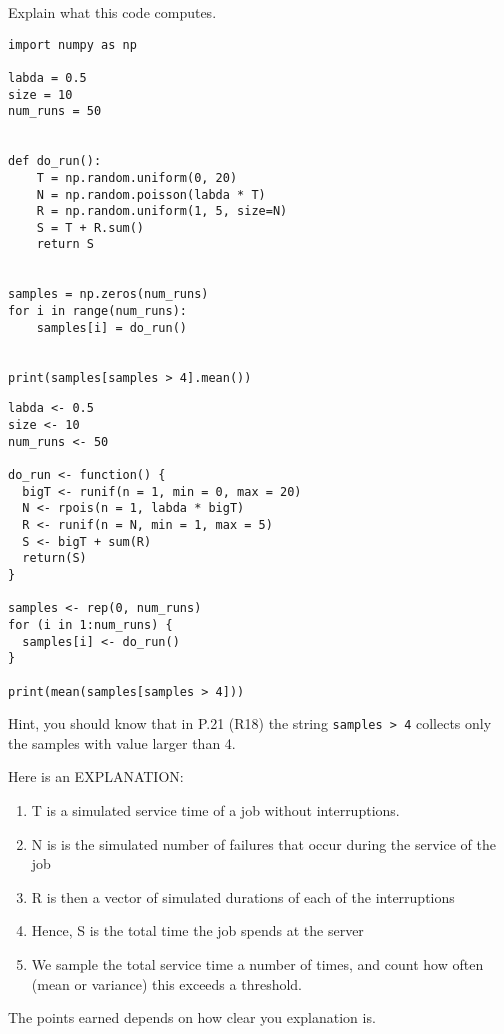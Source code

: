 \begin{exercise}[1.5]
Explain what  this code computes.

\begin{verbatim}
import numpy as np

labda = 0.5
size = 10
num_runs = 50


def do_run():
    T = np.random.uniform(0, 20)
    N = np.random.poisson(labda * T)
    R = np.random.uniform(1, 5, size=N)
    S = T + R.sum()
    return S


samples = np.zeros(num_runs)
for i in range(num_runs):
    samples[i] = do_run()


print(samples[samples > 4].mean())
\end{verbatim}

\begin{verbatim}
labda <- 0.5
size <- 10
num_runs <- 50

do_run <- function() {
  bigT <- runif(n = 1, min = 0, max = 20)
  N <- rpois(n = 1, labda * bigT)
  R <- runif(n = N, min = 1, max = 5)
  S <- bigT + sum(R)
  return(S)
}

samples <- rep(0, num_runs)
for (i in 1:num_runs) {
  samples[i] <- do_run()
}

print(mean(samples[samples > 4]))
\end{verbatim}

Hint, you should know that in P.21 (R18) the string \verb|samples > 4| collects only the samples with value larger than 4.

\begin{solution}
Here is an EXPLANATION:
  \begin{enumerate}
  \item T is a simulated service time of a job without interruptions.
  \item N is is the simulated number of failures that occur during the service of the job
  \item R is then a vector of simulated durations of each of the interruptions
  \item Hence, S is the total time the job spends at the server
  \item We sample the total service time a number of times, and count how often (mean or variance) this exceeds a threshold.
  \end{enumerate}
The points earned depends on how clear you explanation is.




\end{solution}
\end{exercise}
